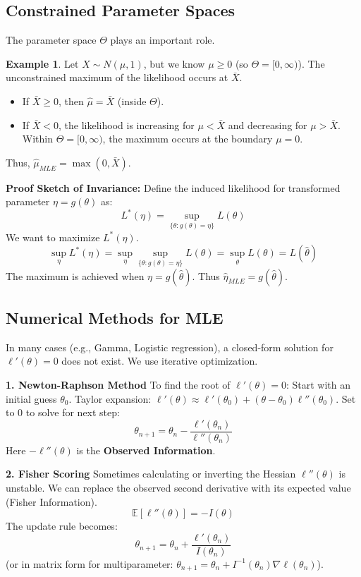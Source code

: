 \documentclass[12pt, a4paper]{article}
\theoremstyle{definition}
\newtheorem{example}{Example}
\newcommand{\E}{\mathbb{E}}
\begin{document}
\subsection{Constrained Parameter Spaces}
The parameter space $\Theta$ plays an important role.
\begin{example}
Let $X \sim N(\mu, 1)$, but we know $\mu \ge 0$ (so $\Theta = [0, \infty)$).
The unconstrained maximum of the likelihood occurs at $\bar{X}$.
\begin{itemize}
    \item If $\bar{X} \ge 0$, then $\hat{\mu} = \bar{X}$ (inside $\Theta$).
    \item If $\bar{X} < 0$, the likelihood is increasing for $\mu < \bar{X}$ and decreasing for $\mu > \bar{X}$. Within $\Theta = [0, \infty)$, the maximum occurs at the boundary $\mu = 0$.
\end{itemize}
Thus, $\hat{\mu}_{MLE} = \max(0, \bar{X})$.
\end{example}

\textbf{Proof Sketch of Invariance:}
Define the induced likelihood for transformed parameter $\eta = g(\theta)$ as:
$$ L^*(\eta) = \sup_{\{\theta : g(\theta) = \eta\}} L(\theta) $$
We want to maximize $L^*(\eta)$.
$$ \sup_{\eta} L^*(\eta) = \sup_{\eta} \sup_{\{\theta : g(\theta)=\eta\}} L(\theta) = \sup_{\theta} L(\theta) = L(\hat{\theta}) $$
The maximum is achieved when $\eta = g(\hat{\theta})$.
Thus $\hat{\eta}_{MLE} = g(\hat{\theta})$.

\subsection{Numerical Methods for MLE}
In many cases (e.g., Gamma, Logistic regression), a closed-form solution for $\ell'(\theta) = 0$ does not exist. We use iterative optimization.

\textbf{1. Newton-Raphson Method}
To find the root of $\ell'(\theta) = 0$:
Start with an initial guess $\theta_0$.
Taylor expansion: $\ell'(\theta) \approx \ell'(\theta_0) + (\theta - \theta_0)\ell''(\theta_0)$.
Set to 0 to solve for next step:
$$ \theta_{n+1} = \theta_n - \frac{\ell'(\theta_n)}{\ell''(\theta_n)} $$
Here $-\ell''(\theta)$ is the \textbf{Observed Information}.

\textbf{2. Fisher Scoring}
Sometimes calculating or inverting the Hessian $\ell''(\theta)$ is unstable.
We can replace the observed second derivative with its expected value (Fisher Information).
$$ \E[\ell''(\theta)] = -I(\theta) $$
The update rule becomes:
$$ \theta_{n+1} = \theta_n + \frac{\ell'(\theta_n)}{I(\theta_n)} $$
(or in matrix form for multiparameter: $\theta_{n+1} = \theta_n + I^{-1}(\theta_n) \nabla \ell(\theta_n)$).
\end{document}
